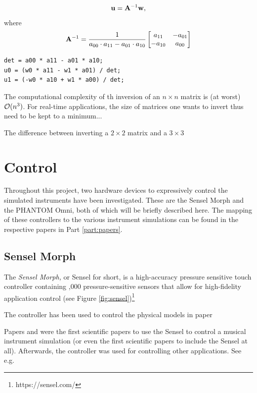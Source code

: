 \begin{equation*}
    \mathbf{u} = \mathbf{A}^{-1}\mathbf{w}, 
\end{equation*}
where
\begin{equation}
    \mathbf{A}^{-1} = \frac{1}{a_{00}\cdot a_{11} - a_{01}\cdot a_{10}}
    \begin{bmatrix}
        a_{11} & -a_{01}\\
        -a_{10} & a_{00} 
    \end{bmatrix}
\end{equation}

\setlstCpp
\begin{lstlisting}
det = a00 * a11 - a01 * a10;
u0 = (w0 * a11 - w1 * a01) / det;
u1 = (-w0 * a10 + w1 * a00) / det;
\end{lstlisting}


The computational complexity of th inversion of an $n\times n$ matrix is (at worst) $\mathcal{O}(n^3)$. For real-time applications, the size of matrices one wants to invert thus need to be kept to a minimum...

The difference between inverting a $2\times 2$ matrix and a $3\times 3$ 

\section{Control}
Throughout this project, two hardware devices to expressively control the simulated instruments have been investigated. These are the Sensel Morph and the PHANTOM Omni, both of which will be briefly described here. The mapping of these controllers to the various instrument simulations can be found in the respective papers in Part \ref{part:papers}. 

\subsection{Sensel Morph}\label{sec:sensel}
The \textit{Sensel Morph,} or Sensel for short, is a high-accuracy pressure sensitive touch controller containing ,000 pressure-sensitive sensors that allow for high-fidelity application control (see Figure \ref{fig:sensel})\footnote{https://sensel.com/}

The controller has been used to control the physical models in  paper

Papers \citeP[A] and \citeP[B] were the first scientific papers to use the Sensel to control a musical instrument simulation (or even the first scientific papers to include the Sensel at all). Afterwards, the controller was used for controlling other applications. See e.g. \cite{Paisa2019,Pardue2020,vanWalstijn2021}

